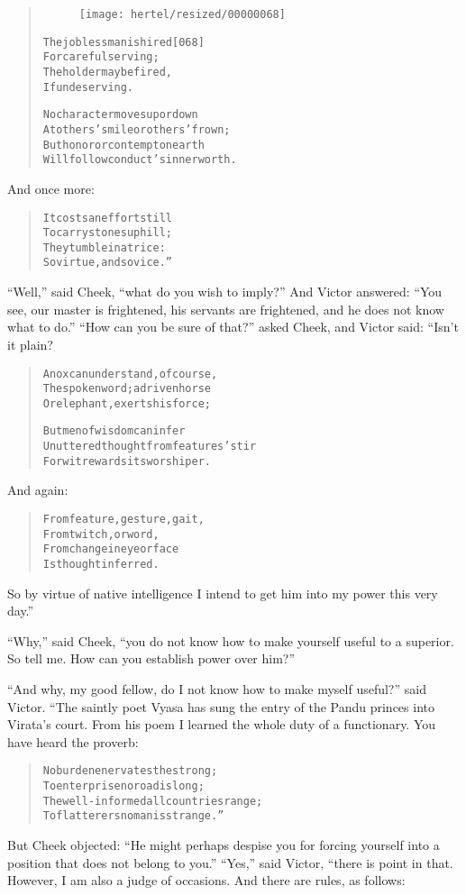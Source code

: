 \documentclass[article, twoside, 10pt]{memoir}
\renewenvironment{verbatim}{%
\begin{quote}%
\vskip -10pt%
\begin{alltt}\normalfont\small}{\end{alltt}%
\end{quote}%
\vskip -10pt
} %
\begin{document}
\begin{verbatim}
\begin{figure}[p]\texttt{[image: hertel/resized/00000068]}\end{figure}The jobless man is hired                                [068]
    For careful serving;
The holder may be fired,
    If undeserving.

No character moves up or down
At others' smile or others' frown;
But honor or contempt on earth
Will follow conduct's inner worth.
\end{verbatim}
And once more:

\begin{verbatim}
It costs an effort still
To carry stones uphill;
They tumble in a trice:
So virtue, and so vice.”
\end{verbatim}
``Well,'' said Cheek, ``what do you wish to imply?'' And Victor
answered:
``You see, our master is frightened, his servants are frightened, and he does not know what to do.''
``How can you be sure of that?'' asked Cheek, and Victor said:
“Isn't it plain?

\begin{verbatim}
An ox can understand, of course,
The spoken word; a driven horse
Or elephant, exerts his force;

But men of wisdom can infer
Unuttered thought from features' stir{\textemdash}
For wit rewards its worshiper.
\end{verbatim}
And again:

\begin{verbatim}
From feature, gesture, gait,
    From twitch, or word,
From change in eye or face
    Is thought inferred.
\end{verbatim}
So by virtue of native intelligence I intend to get him into my
power this very day.”

``Why,'' said Cheek,
``you do not know how to make yourself useful to a superior. So tell me. How can you establish power over him?''

``And why, my good fellow, do I not know how to make myself useful?''
said Victor. “The saintly poet Vyasa has sung the entry of the
Pandu princes into Virata's court. From his poem I learned the
whole duty of a functionary. You have heard the proverb:

\begin{verbatim}
No burden enervates the strong;
To enterprise no road is long;
The well-informed all countries range;
To flatterers no man is strange.”
\end{verbatim}
But Cheek objected:
``He might perhaps despise you for forcing yourself into a position that does not belong to you.''
``Yes,'' said Victor, “there is point in that. However, I am also a
judge of occasions. And there are rules, as follows:
\end{document}
